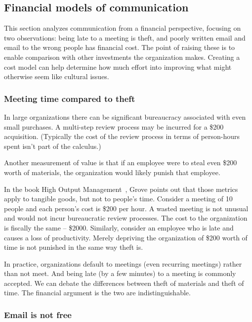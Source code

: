 \subsection*{Financial models of communication\label{sec:financial-models-of-communication}}

This section analyzes communication from a financial perspective, focusing on two observations:
being late to a meeting is theft, 
and poorly written email and email to the wrong people has financial cost.
The point of raising these is to enable comparison with other investments the organization makes. Creating a cost model can help determine how much effort into improving what might otherwise seem like cultural issues.

\subsubsection*{Meeting time compared to theft}

In large organizations there can be significant bureaucracy associated with even small purchases. A multi-step review process may be incurred for a \$200 acquisition. (Typically the cost of the review process in terms of person-hours spent isn't part of the calculus.)

Another measurement of value is that if an employee were to steal even \$200 worth of materials, the organization would likely punish that employee.

In the book High Output Management~\cite{1995_Grove}, Grove points out that those metrics apply to tangible goods, but not to people's time. Consider a meeting of 10 people and each person's cost is \$200 per hour. 
%
A wasted meeting is not unusual and would not incur bureaucratic review processes. The cost to the organization is fiscally the same -- \$2000. Similarly, consider an employee who is late and causes a loss of productivity. Merely depriving the organization of \$200 worth of time is not punished in the same way theft is.

In practice, organizations default to meetings (even recurring meetings) rather than not meet. And being late (by a few minutes) to a meeting is commonly accepted. 
We can debate the differences between theft of materials and theft of time. The financial argument is the two are indistinguishable. 


\subsubsection*{Email is not free}

